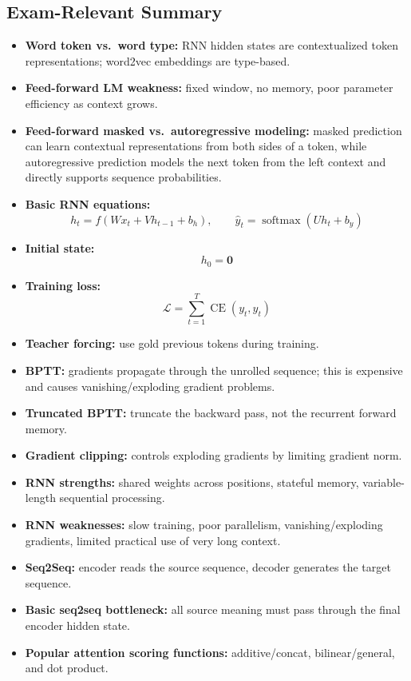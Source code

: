 \documentclass[11pt]{article}
\begin{document}
\subsection{Exam-Relevant Summary}
\begin{itemize}
    \item \textbf{Word token vs.\ word type:} RNN hidden states are contextualized token representations; word2vec embeddings are type-based.
    \item \textbf{Feed-forward LM weakness:} fixed window, no memory, poor parameter efficiency as context grows.
    \item \textbf{Feed-forward masked vs.\ autoregressive modeling:} masked prediction can learn contextual representations from both sides of a token, while autoregressive prediction models the next token from the left context and directly supports sequence probabilities.
    \item \textbf{Basic RNN equations:}
    \[
    h_t = f(Wx_t + Vh_{t-1} + b_h), \qquad
    \hat{y}_t = \operatorname{softmax}(Uh_t + b_y)
    \]
    \item \textbf{Initial state:}
    \[
    h_0 = \mathbf{0}
    \]
    \item \textbf{Training loss:}
    \[
    \mathcal{L} = \sum_{t=1}^{T} \operatorname{CE}(y_t,\hat{y}_t)
    \]
    \item \textbf{Teacher forcing:} use gold previous tokens during training.
    \item \textbf{BPTT:} gradients propagate through the unrolled sequence; this is expensive and causes vanishing/exploding gradient problems.
    \item \textbf{Truncated BPTT:} truncate the backward pass, not the recurrent forward memory.
    \item \textbf{Gradient clipping:} controls exploding gradients by limiting gradient norm.
    \item \textbf{RNN strengths:} shared weights across positions, stateful memory, variable-length sequential processing.
    \item \textbf{RNN weaknesses:} slow training, poor parallelism, vanishing/exploding gradients, limited practical use of very long context.
    \item \textbf{Seq2Seq:} encoder reads the source sequence, decoder generates the target sequence.
    \item \textbf{Basic seq2seq bottleneck:} all source meaning must pass through the final encoder hidden state.
    \item \textbf{Popular attention scoring functions:} additive/concat, bilinear/general, and dot product.

\end{itemize}
\end{document}
